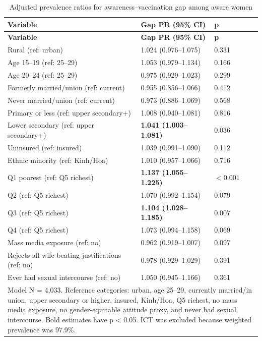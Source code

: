 \begin{longtable}{|p{6.2cm}|p{3.6cm}|p{1.3cm}|}
\caption{Adjusted prevalence ratios for awareness--vaccination gap among aware women}
\label{tab:adjusted_gap}\\
\hline
\textbf{Variable} & \textbf{Gap PR (95\% CI)} & \textbf{p} \\
\hline
\endfirsthead
\hline
\textbf{Variable} & \textbf{Gap PR (95\% CI)} & \textbf{p} \\
\hline
\endhead
Rural (ref: urban) & 1.024 (0.976--1.075) & 0.331 \\
Age 15--19 (ref: 25--29) & 1.053 (0.979--1.134) & 0.166 \\
Age 20--24 (ref: 25--29) & 0.975 (0.929--1.023) & 0.299 \\
Formerly married/union (ref: current) & 0.955 (0.856--1.066) & 0.412 \\
Never married/union (ref: current) & 0.973 (0.886--1.069) & 0.568 \\
Primary or less (ref: upper secondary+) & 1.008 (0.940--1.081) & 0.816 \\
Lower secondary (ref: upper secondary+) & \textbf{1.041 (1.003--1.081)} & 0.036 \\
Uninsured (ref: insured) & 1.039 (0.991--1.090) & 0.112 \\
Ethnic minority (ref: Kinh/Hoa) & 1.010 (0.957--1.066) & 0.716 \\
Q1 poorest (ref: Q5 richest) & \textbf{1.137 (1.055--1.225)} & $<0.001$ \\
Q2 (ref: Q5 richest) & 1.070 (0.992--1.154) & 0.079 \\
Q3 (ref: Q5 richest) & \textbf{1.104 (1.028--1.185)} & 0.007 \\
Q4 (ref: Q5 richest) & 1.073 (0.994--1.158) & 0.069 \\
Mass media exposure (ref: no) & 0.962 (0.919--1.007) & 0.097 \\
Rejects all wife-beating justifications (ref: no) & 0.978 (0.929--1.029) & 0.391 \\
Ever had sexual intercourse (ref: no) & 1.050 (0.945--1.166) & 0.361 \\
\hline
\multicolumn{3}{|p{11.6cm}|}{\footnotesize Model N = 4,033. Reference categories: urban, age 25--29, currently married/in union, upper secondary or higher, insured, Kinh/Hoa, Q5 richest, no mass media exposure, no gender-equitable attitude proxy, and never had sexual intercourse. Bold estimates have p < 0.05. ICT was excluded because weighted prevalence was 97.9\%.} \\
\hline
\end{longtable}

